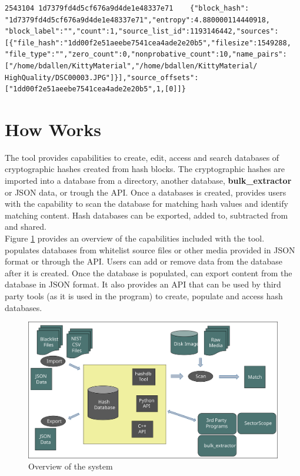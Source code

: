 \documentclass[11pt,fleqn]{article} %
\begin{document}
\begin{enumerate}
\begingroup
\footnotesize
\begin{Verbatim}[fontfamily=courier]
2543104	1d7379fd4d5cf676a9d4de1e48337e71	{"block_hash":
"1d7379fd4d5cf676a9d4de1e48337e71","entropy":4.880000114440918,
"block_label":"","count":1,"source_list_id":1193146442,"sources":
[{"file_hash":"1dd00f2e51aeebe7541cea4ade2e20b5","filesize":1549288,
"file_type":"","zero_count":0,"nonprobative_count":10,"name_pairs":
["/home/bdallen/KittyMaterial","/home/bdallen/KittyMaterial/
HighQuality/DSC00003.JPG"]}],"source_offsets":
["1dd00f2e51aeebe7541cea4ade2e20b5",1,[0]]}
\end{Verbatim}
\endgroup

\end{enumerate}

\section{How \hdb Works}
The \hdb tool provides capabilities to create, edit, access and search databases of cryptographic hashes created from hash blocks. The cryptographic hashes are imported into a database from a directory, another database, \textbf{bulk\_extractor} or JSON data, or trough the \hdb API.
Once a databases is created, \hdb provides users with the capability to scan the database for matching hash values and identify matching content. Hash databases can be exported, added to, subtracted from and shared.\\


Figure \ref{fig:overviewFigure} provides an overview of the capabilities included with the \hdb tool. \hdb populates databases from whitelist source files
or other media provided in JSON format or through the API.
Users can add or remove data from the database after it is created.
Once the database is populated, \hdb can export content from the database in JSON format. It also provides an API that can be used by third party tools (as it is used in the \bulk program) to create, populate and access hash databases.\\

\begin{figure}
	\center
	\includegraphics[scale=.45]{drawings/hashdb_system_overview}
	\caption{Overview of the \hdb system}
	\label{fig:overviewFigure}
\end{figure}
\end{document}
